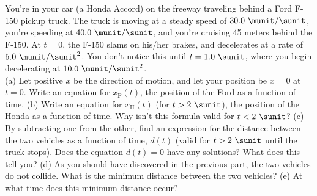 You're in your car (a Honda Accord) on the freeway traveling
behind a Ford F-150 pickup truck. The truck is moving at a steady speed of
$30.0\ \munit/\sunit$, you're speeding at $40.0\ \munit/\sunit$, and you're cruising 45
meters behind the F-150. At $t=0$, the F-150 slams on his/her brakes,
and decelerates at a rate of $5.0\ \munit/\sunit^2$. You don't notice this
until $t=1.0\ \sunit$, where you begin decelerating at $10.0\ \munit/\sunit^2$.\\
%
(a) Let positive $x$ be the direction of motion, and let your position be
$x=0$ at $t=0$. Write an equation for
$x_\text{F}(t)$, the position of the Ford as a function of time.\answercheck\hwendpart
%
(b) Write an equation for $x_\text{H}(t)$ (for $t > 2\ \sunit$), the
position of the Honda as a function of time. Why isn't this
formula valid for $t < 2\ \sunit$?\answercheck\hwendpart
%
(c) By subtracting one from the other, find an expression for the
distance between the two vehicles as a function of time, $d(t)$
(valid for $t > 2\ \sunit$ until the truck stops). Does the equation
$d(t) = 0$ have any solutions? What does this tell you?\answercheck\hwendpart
%
(d) As you should have discovered in the previous part, the two
vehicles do not collide. What is the minimum distance between the two
vehicles?\answercheck\hwendpart
%
(e) At what time does this minimum distance occur?\answercheck
